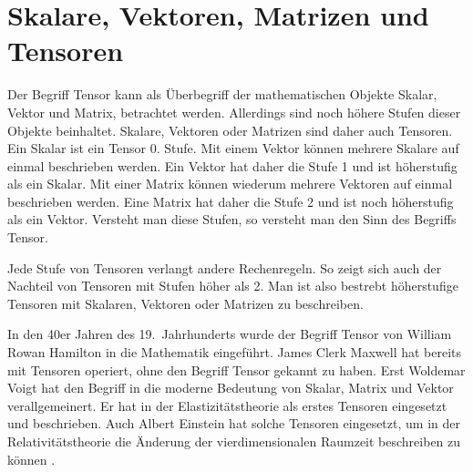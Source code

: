 \section{Skalare, Vektoren, Matrizen und Tensoren\label{spannung:section:Skalare,_Vektoren,_Matrizen_und_Tensoren}}
Der Begriff Tensor kann als Überbegriff der mathematischen Objekte Skalar, Vektor und Matrix, betrachtet werden.
%
Allerdings sind noch höhere Stufen dieser Objekte beinhaltet.
Skalare, Vektoren oder Matrizen sind daher auch Tensoren.
Ein Skalar ist ein Tensor 0. Stufe.
%
Mit einem Vektor können mehrere Skalare auf einmal beschrieben werden.
Ein Vektor hat daher die Stufe 1 und ist höherstufig als ein Skalar.
Mit einer Matrix können wiederum mehrere Vektoren auf einmal beschrieben werden.
Eine Matrix hat daher die Stufe 2 und ist noch höherstufig als ein Vektor.
Versteht man diese Stufen, so versteht man den Sinn des Begriffs Tensor.

Jede Stufe von Tensoren verlangt andere Rechenregeln.
So zeigt sich auch der Nachteil von Tensoren mit Stufen höher als 2.
Man ist also bestrebt höherstufige Tensoren mit Skalaren, Vektoren oder Matrizen zu beschreiben.

In den 40er Jahren des 19.~Jahrhunderts wurde der Begriff Tensor von William Rowan Hamilton in die Mathematik eingeführt.
%
James Clerk Maxwell hat bereits mit Tensoren operiert, ohne den Begriff Tensor gekannt zu haben.
%
Erst Woldemar Voigt hat den Begriff in die moderne Bedeutung von Skalar, Matrix und Vektor verallgemeinert.
Er hat in der Elastizitätstheorie als erstes Tensoren eingesetzt und beschrieben.
%
Auch Albert Einstein hat solche Tensoren eingesetzt,
%
um in der Relativitätstheorie die Änderung der vierdimensionalen Raumzeit beschreiben zu können
%
%
\cite{spannung:Tensor}.

